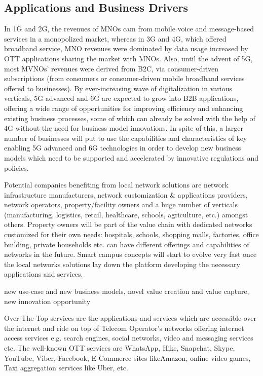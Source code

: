 \documentclass[journal,twocolumn]{IEEEtran}
\begin{document}
\subsection{Applications and Business Drivers}
In 1G and 2G, the revenues of MNOs cam from  mobile voice and message-based services in a monopolized market, whereas in 3G and 4G, which offered broadband service, MNO revenues were dominated by data usage increased by OTT applications sharing the market with MNOs. Also, until the advent of 5G, most MVNOs' revenues were derived from B2C, via consumer-driven subscriptions (from consumers or consumer-driven mobile broadband services offered to businesses). By ever-increasing wave of digitalization in various verticals, 5G advanced and 6G are expected to grow into B2B applications, offering a wide range of opportunities for improving efficiency and enhancing existing business processes, some of which can already be solved with the help of 4G without the need for business model innovations. In spite of this, a larger number of businesses will put to use the capabilities and characteristics of key enabling 5G advanced and 6G technologies in order to develop new business models which need to be supported and accelerated by innovative regulations and policies.  


Potential companies benefiting from local network solutions are network infrastructure manufacturers, network customization & applications providers, network operators, property/facility owners and a huge number of verticals (manufacturing, logistics, retail, healthcare, schools, agriculture, etc.) amongst others. Property owners will be part of the value chain with dedicated networks customized for their own needs: hospitals, schools, shopping malls, factories, office building, private households etc. can have different offerings and capabilities of networks in the future. Smart campus concepts will start to evolve very fast once the local networks solutions lay down the platform developing the necessary applications and services.


new use-case and new business models, novel value creation and value capture, new innovation opportunity 


  Over-The-Top services are the applications and services which are accessible
over the internet and ride on top of Telecom Operator’s networks offering
internet access services e.g. search engines, social networks, video and
messaging services etc. The well-known OTT services are WhatsApp, Hike,
Snapchat, Skype, YouTube, Viber, Facebook, E-Commerce sites likeAmazon,
online video games, Taxi aggregation services like Uber, etc.
\end{document}
